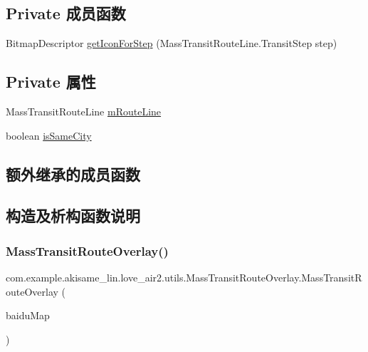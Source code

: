 \subsection*{Private 成员函数}
\begin{DoxyCompactItemize}
\item 
Bitmap\+Descriptor \mbox{\hyperlink{classcom_1_1example_1_1akisame__lin_1_1love__air2_1_1utils_1_1_mass_transit_route_overlay_a285d42675f3c691e6c57c7ded573f629}{get\+Icon\+For\+Step}} (Mass\+Transit\+Route\+Line.\+Transit\+Step step)
\end{DoxyCompactItemize}
\subsection*{Private 属性}
\begin{DoxyCompactItemize}
\item 
Mass\+Transit\+Route\+Line \mbox{\hyperlink{classcom_1_1example_1_1akisame__lin_1_1love__air2_1_1utils_1_1_mass_transit_route_overlay_a630b1958323658e0f8a9bfae2a2099c0}{m\+Route\+Line}}
\item 
boolean \mbox{\hyperlink{classcom_1_1example_1_1akisame__lin_1_1love__air2_1_1utils_1_1_mass_transit_route_overlay_a37d5facff73f9295aefab9690977cac0}{is\+Same\+City}}
\end{DoxyCompactItemize}
\subsection*{额外继承的成员函数}


\subsection{构造及析构函数说明}
\mbox{\label{classcom_1_1example_1_1akisame__lin_1_1love__air2_1_1utils_1_1_mass_transit_route_overlay_aae6920db4e829a36c19599734469b063}} 
\subsubsection{\texorpdfstring{MassTransitRouteOverlay()}{MassTransitRouteOverlay()}}
{\footnotesize\ttfamily com.\+example.\+akisame\+\_\+lin.\+love\+\_\+air2.\+utils.\+Mass\+Transit\+Route\+Overlay.\+Mass\+Transit\+Route\+Overlay (\begin{DoxyParamCaption}\item[{Baidu\+Map}]{baidu\+Map }\end{DoxyParamCaption})\hspace{0.3cm}{\ttfamily [inline]}}

